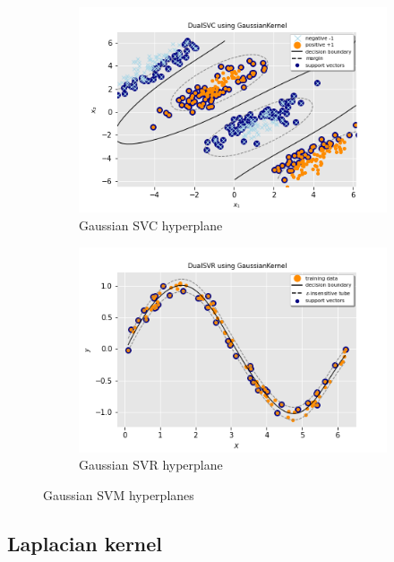 \begin{figure}[h!]
	\centering
	\begin{subfigure}{.49\textwidth}
		\centering
		\includegraphics[width=\textwidth]{img/gaussian_dual_l1_svc_hyperplane}
		\caption{Gaussian SVC hyperplane}
		\label{fig:gaussian_dual_l1_svc_hyperplane}
	\end{subfigure}
	\begin{subfigure}{.49\textwidth}
		\centering
		\captionsetup{justification=centering}
		\includegraphics[width=\textwidth]{img/gaussian_dual_l1_svr_hyperplane}
		\caption{Gaussian SVR hyperplane}
		\label{fig:gaussian_dual_l1_svr_hyperplane}
	\end{subfigure}
\caption{Gaussian SVM hyperplanes}
\end{figure}

\subsection{Laplacian kernel}

